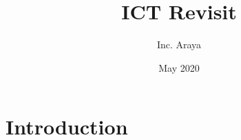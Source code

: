 \documentclass{article}
\title{ICT Revisit}
\author{Inc. Araya}
\date{May 2020}
\begin{document}
\maketitle

\section{Introduction}
\end{document}
